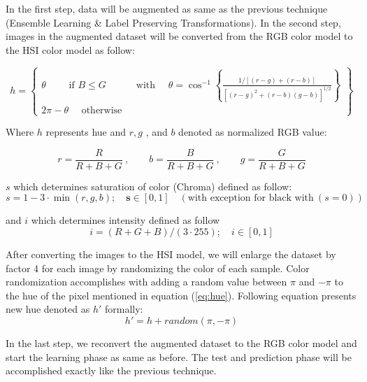 In the first step, data will be augmented as same as the previous technique (Ensemble Learning \& Label Preserving Transformations). In the second step, images in the augmented dataset will be converted from the RGB color model to the HSI color model \cite{image-processing} as follow:

\begin{equation}
  \label{eq:hue}
  h=\left\{\begin{array}{ll}
    \theta \quad \quad \text { if } B \leq G & \text { with } \quad \theta=\cos ^{-1}\left\{\frac{1 /[(r-g)+(r-b)]}{\left[(r-g)^{2}+(r-b)(g-b)\right]^{1 / 2}}\right\} \\
    2 \pi-\theta \quad \text { otherwise }   &
  \end{array}\right\}
\end{equation}

Where $h$ represents hue and $r,g$ , and $b$ denoted as normalized RGB value:

\begin{equation}
  r = \frac{R}{R+B+G} \ , \quad \quad b = \frac{B}{R+B+G} \ , \quad \quad g = \frac{G}{R+B+G}
\end{equation}


$s$ which determines saturation of color (Chroma) defined as follow:
\begin{equation}
  s=1-3 \cdot \min (r, g, b) ; \quad \mathbf{s} \in[0,1] \quad (\text{with exception for black with} \ (s=0) )
\end{equation}

and $i$ which determines intensity defined as follow
\begin{equation}
  i=(R+G+B) /(3 \cdot 255) ; \quad i \in[0,1]
\end{equation}

After converting the images to the HSI model, we will enlarge the dataset by factor 4 for each
image by randomizing the color of each sample. Color randomization accomplishes with adding a
random value between $\pi$ and $- \pi$ to the hue of the pixel mentioned in equation
(\ref{eq:hue}). Following equation presents new hue denoted as $h'$ formally:
\begin{equation}
  \label{eq:new_hue}
  h'= h + random(\pi, - \pi)
\end{equation}

In the last step, we reconvert the augmented dataset to the RGB color model and start the learning phase as same as before. The test and prediction phase will be accomplished exactly like the previous technique.

